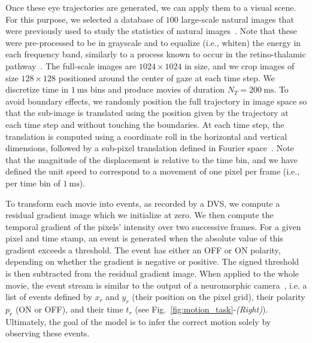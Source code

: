 \documentclass[default]{sn-jnl}%
\theoremstyle{thmstyleone}%
\theoremstyle{thmstyletwo}%
\theoremstyle{thmstylethree}%
\newcommand{\seeFig}[1]{see Fig.~\ref{fig:#1}}%
\newcommand{\ms}{\si{\milli\second}}%
\newcommand{\arank}{r} %
\newcommand{\timev}{t} %
\newcommand{\polev}{p} %
\begin{document}
Once these eye trajectories are generated, we can apply them to a visual scene. For this purpose, we selected a database of $100$ large-scale natural images that were previously used to study the statistics of natural images~\citep{vanHateren1998}. Note that these were pre-processed to be in grayscale and to equalize (i.e., whiten) the energy in each frequency band, similarly to a process known to occur in the retino-thalamic pathway~\citep{dan_efficient_1996}. The full-scale images are $1024 \times 1024$ in size, and we crop images of size $128 \times 128$ positioned around the center of gaze at each time step. We discretize time in $1~\ms$ bins and produce movies of duration $N_T = 200~\ms$. To avoid boundary effects, we randomly position the full trajectory in image space so that the sub-image is translated using the position given by the trajectory at each time step and without touching the boundaries. At each time step, the translation is computed using a coordinate roll in the horizontal and vertical dimensions, followed by a sub-pixel translation defined in Fourier space~\citep{perrinet_sparse_2015}. Note that the magnitude of the displacement is relative to the time bin, and we have defined the unit speed to correspond to a movement of one pixel per frame (i.e., per time bin of $1~\ms$).

To transform each movie into events, as recorded by a DVS, we compute a residual gradient image which we initialize at zero. We then compute the temporal gradient of the pixels' intensity over two successive frames. For a given pixel and time stamp, an event is generated when the absolute value of this gradient exceeds a threshold. The event has either an OFF or ON polarity, depending on whether the gradient is negative or positive. The signed threshold is then subtracted from the residual gradient image. When applied to the whole movie, the event stream is similar to the output of a neuromorphic camera~\citep{Gallego2022}, i.e. a list of events defined by $x_\arank$ and $y_\arank$ (their position on the pixel grid), their polarity $\polev_\arank$ (ON or OFF), and their time $\timev_\arank$ (\seeFig{motion_task}-\textit{(Right)}). Ultimately, the goal of the model is to infer the correct motion solely by observing these events.
\end{document}

